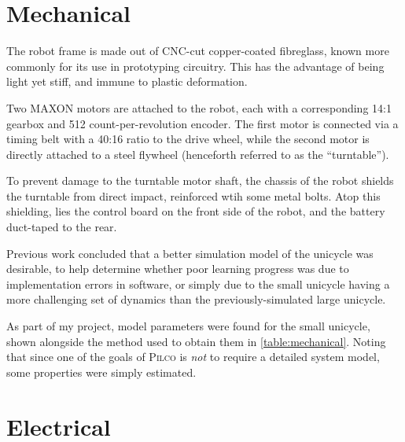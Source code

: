 \documentclass[main.tex]{subfiles}
\begin{document}
\section{Mechanical}

	The robot frame is made out of CNC-cut copper-coated fibreglass, known more commonly for its use in prototyping circuitry.
	This has the advantage of being light yet stiff, and immune to plastic deformation.

	Two MAXON motors\cite{motor} are attached to the robot, each with a corresponding 14:1 gearbox\cite{gearbox} and 512 count-per-revolution encoder\cite{encoder}.
	The first motor is connected via a timing belt with a 40:16 ratio to the drive wheel, while the second motor is directly attached to a steel flywheel (henceforth referred to as the \enquote{turntable}).

	To prevent damage to the turntable motor shaft, the chassis of the robot shields the turntable from direct impact, reinforced wtih some metal bolts.
	Atop this shielding, lies the control board on the front side of the robot, and the battery duct-taped to the rear.

	Previous work concluded \cite[p.~54]{aleksi} that a better simulation model of the unicycle was desirable, to help determine whether poor learning progress was due to implementation errors in software, or simply due to the small unicycle having a more challenging set of dynamics than the previously-simulated large unicycle.

	As part of my project, model parameters were found for the small unicycle, shown alongside the method used to obtain them in \cref{table:mechanical}.
	Noting that since one of the goals of \textsc{Pilco} is \emph{not} to require a detailed system model, some properties were simply estimated.

	\begin{table}
		
		\label{table:mechanical}
	\end{table}



\section{Electrical}
\end{document}
